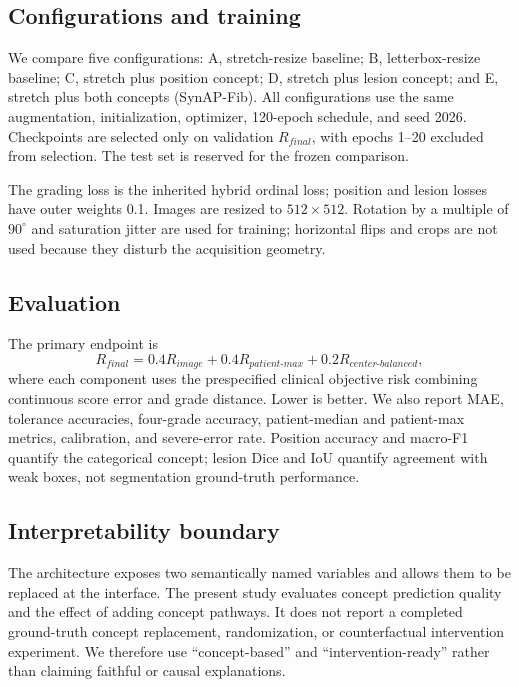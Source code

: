 \subsection{Configurations and training}
We compare five configurations: A, stretch-resize baseline; B, letterbox-resize baseline; C, stretch plus position concept; D, stretch plus lesion concept; and E, stretch plus both concepts (SynAP-Fib). All configurations use the same augmentation, initialization, optimizer, 120-epoch schedule, and seed 2026. Checkpoints are selected only on validation $R_{final}$, with epochs 1--20 excluded from selection. The test set is reserved for the frozen comparison.

The grading loss is the inherited hybrid ordinal loss; position and lesion losses have outer weights 0.1. Images are resized to $512\times512$. Rotation by a multiple of $90^\circ$ and saturation jitter are used for training; horizontal flips and crops are not used because they disturb the acquisition geometry.

\subsection{Evaluation}
The primary endpoint is
\begin{equation}
R_{final}=0.4R_{image}+0.4R_{patient\text{-}max}+0.2R_{center\text{-}balanced},
\end{equation}
where each component uses the prespecified clinical objective risk combining continuous score error and grade distance. Lower is better. We also report MAE, tolerance accuracies, four-grade accuracy, patient-median and patient-max metrics, calibration, and severe-error rate. Position accuracy and macro-F1 quantify the categorical concept; lesion Dice and IoU quantify agreement with weak boxes, not segmentation ground-truth performance.

\subsection{Interpretability boundary}
The architecture exposes two semantically named variables and allows them to be replaced at the interface. The present study evaluates concept prediction quality and the effect of adding concept pathways. It does not report a completed ground-truth concept replacement, randomization, or counterfactual intervention experiment. We therefore use ``concept-based'' and ``intervention-ready'' rather than claiming faithful or causal explanations.
